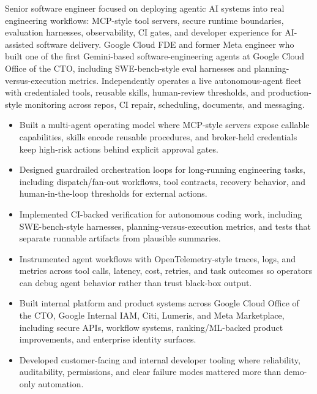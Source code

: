 


Senior software engineer focused on deploying agentic AI systems into real engineering workflows: MCP-style tool servers, secure runtime boundaries, evaluation harnesses, observability, CI gates, and developer experience for AI-assisted software delivery. Google Cloud FDE and former Meta engineer who built one of the first Gemini-based software-engineering agents at Google Cloud Office of the CTO, including SWE-bench-style eval harnesses and planning-versus-execution metrics. Independently operates a live autonomous-agent fleet with credentialed tools, reusable skills, human-review thresholds, and production-style monitoring across repos, CI repair, scheduling, documents, and messaging.
\begin{itemize}
  \item Built a multi-agent operating model where MCP-style servers expose callable capabilities, skills encode reusable procedures, and broker-held credentials keep high-risk actions behind explicit approval gates.
  \item Designed guardrailed orchestration loops for long-running engineering tasks, including dispatch/fan-out workflows, tool contracts, recovery behavior, and human-in-the-loop thresholds for external actions.
  \item Implemented CI-backed verification for autonomous coding work, including SWE-bench-style harnesses, planning-versus-execution metrics, and tests that separate runnable artifacts from plausible summaries.
\end{itemize}
\begin{itemize}
  \item Instrumented agent workflows with OpenTelemetry-style traces, logs, and metrics across tool calls, latency, cost, retries, and task outcomes so operators can debug agent behavior rather than trust black-box output.
  \item Built internal platform and product systems across Google Cloud Office of the CTO, Google Internal IAM, Citi, Lumeris, and Meta Marketplace, including secure APIs, workflow systems, ranking/ML-backed product improvements, and enterprise identity surfaces.
  \item Developed customer-facing and internal developer tooling where reliability, auditability, permissions, and clear failure modes mattered more than demo-only automation.
\end{itemize}




